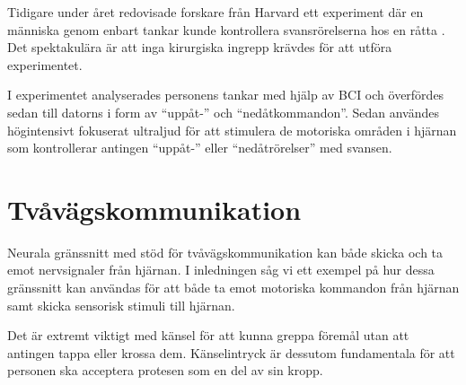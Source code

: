 \documentclass[12pt, a4paper]{article}
\begin{document}
Tidigare under året redovisade forskare från Harvard ett experiment där en
människa genom enbart tankar kunde kontrollera svansrörelserna hos en råtta
\cite{bbi}. Det spektakulära är att inga kirurgiska ingrepp krävdes för att
utföra experimentet.

I experimentet analyserades personens tankar med hjälp av BCI och överfördes
sedan till datorns i form av ``uppåt-'' och ``nedåtkommandon''. Sedan användes
högintensivt fokuserat ultraljud för att stimulera de motoriska områden i
hjärnan som kontrollerar antingen ``uppåt-'' eller ``nedåtrörelser'' med
svansen.



\section{Tvåvägskommunikation}

Neurala gränssnitt med stöd för tvåvägskommunikation kan både skicka och ta emot
nervsignaler från hjärnan. I inledningen såg vi ett exempel på hur dessa
gränssnitt kan användas för att både ta emot motoriska kommandon från hjärnan
samt skicka sensorisk stimuli till hjärnan.


Det är extremt viktigt med känsel för att kunna greppa föremål utan att antingen
tappa eller krossa dem. Känselintryck är dessutom fundamentala för att personen
ska acceptera protesen som en del av sin kropp. \cite{prosthetic_operation}


%
%
%
%
%
%
%
\end{document}
